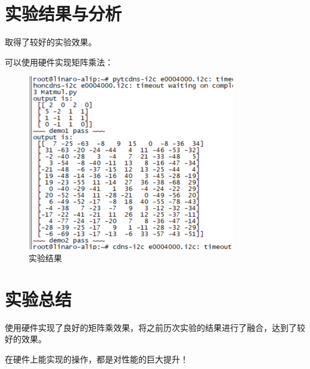 \documentclass[12pt,a4paper]{article}
\begin{document}
\section{实验结果与分析}

取得了较好的实验效果。

可以使用硬件实现矩阵乘法：

\begin{figure}[htbp]
    \centering
    \includegraphics[width=0.6\linewidth]{img/result_result.png}
    \caption{实验结果}
\end{figure}

\section{实验总结}

使用硬件实现了良好的矩阵乘效果，将之前历次实验的结果进行了融合，达到了较好的效果。

在硬件上能实现的操作，都是对性能的巨大提升！
\end{document}
